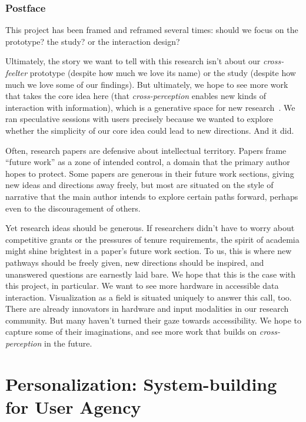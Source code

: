 \documentclass[12pt]{cmuthesis}
\begin{document}
\newpage

\section{Postface}

This project has been framed and reframed several times: should we focus on the prototype? the study? or the interaction design?

Ultimately, the story we want to tell with this research isn't about our \textit{cross-feelter} prototype (despite how much we love its name) or the study (despite how much we love some of our findings). But ultimately, we hope to see more work that takes the core idea here (that \textit{cross-perception} enables new kinds of interaction with information), which is a generative space for new research~\cite{BeaudouinLafon2021}. We ran speculative sessions with users precisely because we wanted to explore whether the simplicity of our core idea could lead to new directions. And it did.

Often, research papers are defensive about intellectual territory. Papers frame ``future work'' as a zone of intended control, a domain that the primary author hopes to protect. Some papers are generous in their future work sections, giving new ideas and directions away freely, but most are situated on the style of narrative that the main author intends to explore certain paths forward, perhaps even to the discouragement of others.

Yet research ideas should be generous. If researchers didn't have to worry about competitive grants or the pressures of tenure requirements, the spirit of academia might shine brightest in a paper's future work section. To us, this is where new pathways should be freely given, new directions should be inspired, and unanswered questions are earnestly laid bare. We hope that this is the case with this project, in particular. We want to see more hardware in accessible data interaction. Visualization as a field is situated uniquely to answer this call, too. There are already innovators in hardware and input modalities in our research community. But many haven't turned their gaze towards accessibility. We hope to capture some of their imaginations, and see more work that builds on \textit{cross-perception} in the future.

\part{Personalization: System-building for User Agency}
\end{document}
